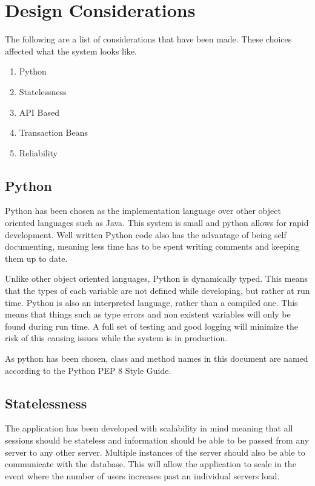 \section{Design Considerations}

\par
The following are a list of considerations that have been made. These choices affected what the system looks like.

\begin{enumerate}
	\item Python
	\item Statelessness
	\item API Based
	\item Transaction Beans
	\item Reliability
\end{enumerate}

\subsection{Python}
\par
Python has been chosen as the implementation language over other object oriented languages such as Java. This system is small and python allows for rapid development. Well written Python code also has the advantage of being self documenting, meaning less time has to be spent writing comments and keeping them up to date.

\par
Unlike other object oriented languages, Python is dynamically typed. This means that the types of each variable are not defined while developing, but rather at run time. Python is also an interpreted language, rather than a compiled one. This means that things such as type errors and non existent variables will only be found during run time. A full set of testing and good logging will minimize the risk of this causing issues while the system is in production.

\par
As python has been chosen, class and method names in this document are named according to the Python PEP 8 Style Guide.


\subsection{Statelessness}
\par
The application has been developed with scalability in mind meaning that all sessions should be stateless and information should be able to be passed from any server to any other server. Multiple instances of the server should also be able to communicate with the database. This will allow the application to scale in the event where the number of users increases past an individual servers load.

